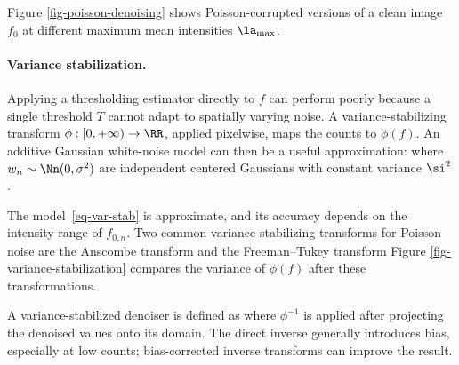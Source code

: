 Figure \ref{fig-poisson-denoising} shows Poisson-corrupted versions of a clean image $f_0$ at different maximum mean intensities $\la_{\max}$.


\paragraph{Variance stabilization.}

Applying a thresholding estimator
directly to $f$ can perform poorly because a single threshold $T$ cannot adapt to spatially varying noise. A variance-stabilizing transform $\phi : [0,+\infty) \rightarrow \RR$, applied pixelwise, maps the counts to $\phi(f)$. An additive Gaussian white-noise model can then be a useful approximation:
where $w_n\sim\Nn(0,\sigma^2)$ are independent centered Gaussians with constant variance $\si^2$.

The model~\eqref{eq-var-stab} is approximate, and its accuracy depends on the intensity range of $f_{0,n}$.
Two common variance-stabilizing transforms for Poisson noise are the Anscombe transform
and the Freeman--Tukey transform
Figure \ref{fig-variance-stabilization} compares the variance of $\phi(f)$ after these transformations.


A variance-stabilized denoiser is defined as
where $\phi^{-1}$ is applied after projecting the denoised values onto its domain. The direct inverse generally introduces bias, especially at low counts; bias-corrected inverse transforms can improve the result.

